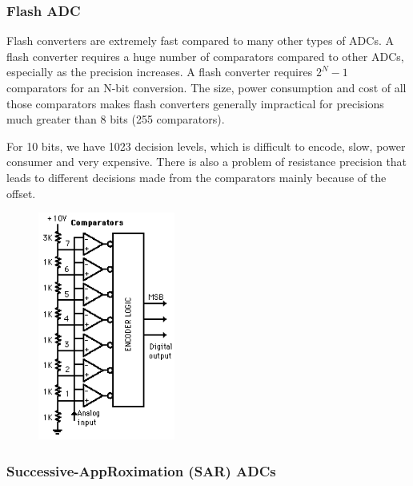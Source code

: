 \subsubsection{Flash ADC}

\begin{minipage}[c]{0.5\linewidth}
Flash converters are extremely fast compared to many other types of ADCs. A flash converter requires a huge number of comparators compared to other ADCs, especially as the precision increases. A flash converter requires $ 2^{N}-1$ comparators for an N-bit conversion. The size, power consumption and cost of all those comparators makes flash converters generally impractical for precisions much greater than 8 bits (255 comparators).

For 10 bits, we have 1023 decision levels, which is difficult to encode, slow, power consumer and very expensive. There is also a problem of resistance precision that leads to different decisions made from the comparators mainly because of the offset.
\end{minipage}\hfill
\begin{minipage}[c]{0.5 \linewidth}

\begin{figure}[H]
    \centering
    \includegraphics[width =  0.4\textwidth]{L5/img/flash-ADC.png}
\end{figure}

\end{minipage}

\subsubsection{Successive-AppRoximation (SAR) ADCs}

